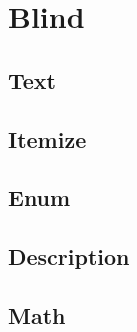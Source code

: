 \documentclass[12pt, a4paper]{article}
\begin{document}
\section{Blind}

\subsection{Text}

\blindtext

\subsection{Itemize}

\blinditemize[5]

\subsection{Enum}

\blindenumerate[5]

\subsection{Description}

\blinddescription[5]

\subsection{Math}

\blindmathpaper
\end{document}
